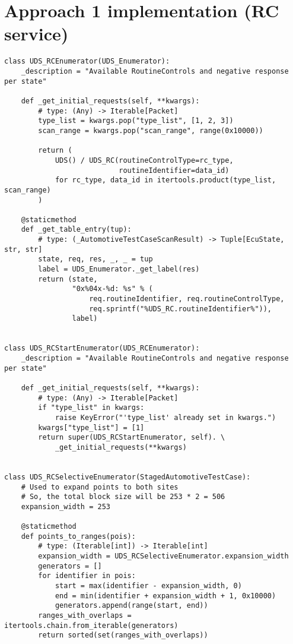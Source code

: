 \appendix

\section{Approach 1 implementation (RC service)}
\label{app:rc-implementation}

\begin{verbatim}
class UDS_RCEnumerator(UDS_Enumerator):
    _description = "Available RoutineControls and negative response per state"

    def _get_initial_requests(self, **kwargs):
        # type: (Any) -> Iterable[Packet]
        type_list = kwargs.pop("type_list", [1, 2, 3])
        scan_range = kwargs.pop("scan_range", range(0x10000))

        return (
            UDS() / UDS_RC(routineControlType=rc_type,
                           routineIdentifier=data_id)
            for rc_type, data_id in itertools.product(type_list, scan_range)
        )

    @staticmethod
    def _get_table_entry(tup):
        # type: (_AutomotiveTestCaseScanResult) -> Tuple[EcuState, str, str]
        state, req, res, _, _ = tup
        label = UDS_Enumerator._get_label(res)
        return (state,
                "0x%04x-%d: %s" % (
                    req.routineIdentifier, req.routineControlType,
                    req.sprintf("%UDS_RC.routineIdentifier%")),
                label)


class UDS_RCStartEnumerator(UDS_RCEnumerator):
    _description = "Available RoutineControls and negative response per state"

    def _get_initial_requests(self, **kwargs):
        # type: (Any) -> Iterable[Packet]
        if "type_list" in kwargs:
            raise KeyError("'type_list' already set in kwargs.")
        kwargs["type_list"] = [1]
        return super(UDS_RCStartEnumerator, self). \
            _get_initial_requests(**kwargs)


class UDS_RCSelectiveEnumerator(StagedAutomotiveTestCase):
    # Used to expand points to both sites
    # So, the total block size will be 253 * 2 = 506
    expansion_width = 253

    @staticmethod
    def points_to_ranges(pois):
        # type: (Iterable[int]) -> Iterable[int]
        expansion_width = UDS_RCSelectiveEnumerator.expansion_width
        generators = []
        for identifier in pois:
            start = max(identifier - expansion_width, 0)
            end = min(identifier + expansion_width + 1, 0x10000)
            generators.append(range(start, end))
        ranges_with_overlaps = itertools.chain.from_iterable(generators)
        return sorted(set(ranges_with_overlaps))


\end{verbatim}
